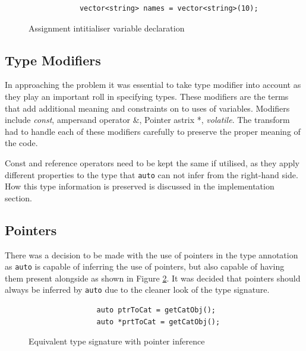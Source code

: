 \documentclass[bsc,frontabs,singlespacing,parskip,deptreport]{infthesis}
\begin{document}
\begin{figure}[!h]
    \begin{verbatim}
            vector<string> names = vector<string>(10);
    \end{verbatim}
    \caption{Assignment intitialiser variable declaration}
    \label{fig:ass-var}
\end{figure}

\subsection{Type Modifiers}
In approaching the problem it was essential to take type modifier into account as they play an important roll in specifying types. These modifiers are the terms that add additional meaning and constraints on to uses of variables. Modifiers include \textit{const}, ampersand operator \&, Pointer astrix *, \textit{volatile}. The transform had to handle each of these modifiers carefully to preserve the proper meaning of the code. 

Const and reference operators need to be kept the same if utilised, as they apply different properties to the type that \texttt{auto} can not infer from the right-hand side. How this type information is preserved is discussed in the implementation section. 

\subsection{Pointers}
There was a decision to be made with the use of pointers in the type annotation as \texttt{auto} is capable of inferring the use of pointers, but also capable of having them present alongside as shown in Figure \ref{fig:ptr_type_inf}. It was decided that pointers should always be inferred by \texttt{auto} due to the cleaner look of the type signature. 

\begin{figure}[!h]
    \centering
    \begin{verbatim}
                auto ptrToCat = getCatObj();
                auto *prtToCat = getCatObj();
    \end{verbatim}
    \caption{Equivalent type signature with pointer inference}
    \label{fig:ptr_type_inf}
\end{figure}
\end{document}
